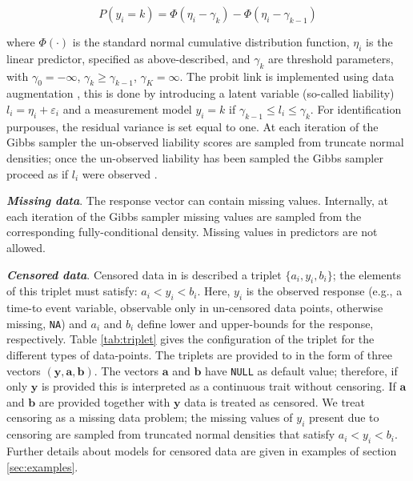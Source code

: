 \documentclass[article,shortnames,nojss]{jss}
\begin{document}
\begin{equation*}
  P(y_i=k)=\Phi(\eta_i-\gamma_k)-\Phi(\eta_i-\gamma_{k-1})
\end{equation*}

where $\Phi(\cdot)$ is the standard normal cumulative distribution function, 
$\eta_i$ is the linear predictor, specified as above-described, and 
$\gamma_k$ are threshold parameters, with 
$\gamma_0=-\infty$, $\gamma_k \geq \gamma_{k-1}$, $\gamma_K=\infty$.  
The probit link is implemented using data augmentation \citep{Tanner:1987}, 
this is done by introducing a latent variable (so-called liability) 
$l_i=\eta_i+\varepsilon_i$ and a measurement model $y_i=k$ if $\gamma_{k-1} \leq l_i \leq \gamma_k$.
For identification purpouses, the residual variance is set equal to one. 
At each iteration of the Gibbs sampler the un-observed liability 
scores are sampled from truncate normal densities; once 
the un-observed liability has been sampled the Gibbs sampler proceed as 
if  $l_i$ were observed \citep[see][for further details]{Albert:1993}.

\textbf{\emph{Missing data}}.  The response vector 
can contain missing values. Internally, at each iteration of the Gibbs 
sampler missing values are sampled from the corresponding 
fully-conditional density. Missing values in predictors are not allowed.

\textbf{\emph{Censored data}}. Censored data in  is described a 
triplet $\{a_i, y_i , b_i\}$; the elements of this 
triplet must satisfy: $a_i <y_i<b_i$. Here, $y_i$  is 
the observed response (e.g., a time-to event variable, 
observable only in un-censored data points, 
otherwise missing, \texttt{NA}) and $a_i$  and $b_i$  
define lower and upper-bounds for the response, 
respectively. Table \ref{tab:triplet} gives the configuration of 
the triplet for the different types of data-points. 
The triplets are provided to  in the form of three vectors 
$(\boldsymbol y, \boldsymbol a, \boldsymbol b)$. The vectors 
$\boldsymbol a$ and $\boldsymbol b$ have \texttt{NULL} as default value; 
therefore, if only $\boldsymbol y$ is provided this 
is interpreted as a continuous trait without censoring. 
If $\boldsymbol a$ and $\boldsymbol b$ are provided 
together with $\boldsymbol y$ data is treated as censored. 
We treat censoring as a missing data problem; the missing values of $y_i$ present due 
to censoring are sampled from truncated normal densities 
that satisfy $a_i <y_i<b_i$. Further details about models 
for censored data are given in examples of section \ref{sec:examples}.
\end{document}
